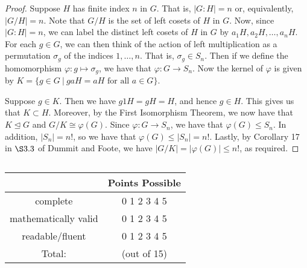 \documentclass[11pt, reqno]{amsart}
\theoremstyle{plain}
\theoremstyle{definition}
\theoremstyle{example}
\def\normeq{\unlhd}
\newcommand{\Rubric}[1]{$~$\\\vfill \hfill{\def\arraystretch{1.75}\begin{tabular} {|c|c|} \hline
#1 & Points Possible  \\ \hline \hline
complete & \hspace{3mm} 0 \hspace{3mm} 1 \hspace{3mm} 2 \hspace{3mm} 
			3 \hspace{3mm} 4 \hspace{3mm} 5 \hspace{3mm} \\ \hline
mathematically valid & \hspace{3mm} 0 \hspace{3mm} 1 \hspace{3mm} 2 \hspace{3mm} 
			3 \hspace{3mm} 4 \hspace{3mm} 5 \hspace{3mm} \\ \hline
readable/fluent & \hspace{3mm} 0 \hspace{3mm} 1 \hspace{3mm} 2 \hspace{3mm} 
			3 \hspace{3mm} 4 \hspace{3mm} 5 \hspace{3mm} \\ \hline
Total:& \qquad\qquad\qquad(out of 15)\\
\hline
\end{tabular}}
\pagebreak}
\begin{document}
\begin{proof}
Suppose $H$ has finite index $n$ in $G$. That is, $|G : H| = n$ or, equivalently, $|G/H| = n$. Note that $G/H$ is the set of left cosets of $H$ in $G$. Now, since $|G : H| = n$, we can label the distinct left cosets of $H$ in $G$ by $a_1H, a_2H, \ldots, a_nH$. For each $g \in G$, we can then think of the action of left multiplication as a permutation $\sigma_g$ of the indices $1, \ldots, n$. That is, $\sigma_g \in S_n$. Then if we define the homomorphism $\varphi: g \mapsto \sigma_g$, we have that $\varphi: G \to S_{n}$. Now the kernel of $\varphi$ is given by $K = \{g \in G \ | \ gaH = aH \text{ for all } a \in G\}$.

\par
Suppose $g \in K$. Then we have $g1H = gH = H$, and hence $g \in H$. This gives us that $K \subset H$. Moreover, by the First Isomorphism Theorem, we now have that $K \normeq G$ and $G/K \cong \varphi(G)$. Since $\varphi: G \to S_n$, we have that $\varphi(G) \leq S_n$. In addition, $|S_n| = n!$, so we have that $\varphi(G) \leq |S_n| = n!$. Lastly, by Corollary 17 in $\S 3.3$ of Dummit and Foote, we have $|G/K| = |\varphi(G)| \leq n!$, as required.
\end{proof}

\Rubric{}
\end{document}
